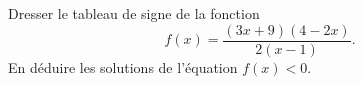 
\begin{exercice}\label{exosmath-0324}

    Dresser le tableau de signe de la fonction
    \begin{equation}
        f(x)=\frac{ (3x+9)(4-2x) }{ 2(x-1) }.
    \end{equation}
    En déduire les solutions de l'équation \( f(x)<0\).

\end{exercice}
